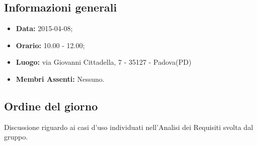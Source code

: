 \subsection{Informazioni generali}
\begin{itemize}
	\item \textbf{Data:} 2015-04-08;
	\item \textbf{Orario:} 10.00 - 12.00;
	\item \textbf{Luogo:} via Giovanni Cittadella, 7 - 35127 - Padova(PD)
	\item \textbf{Membri Assenti:} Nessuno.
\end{itemize}

\subsection{Ordine del giorno}
Discussione riguardo ai casi d'uso individuati nell'Analisi dei Requisiti svolta dal gruppo.
